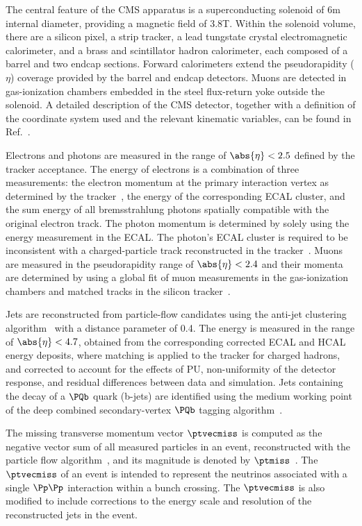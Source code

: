 The central feature of the CMS apparatus is a superconducting solenoid of 6\unit{m} internal diameter, providing a magnetic field of 3.8\unit{T}. Within the solenoid volume, there are a silicon pixel, a strip tracker, a lead tungstate crystal electromagnetic calorimeter, and a brass and scintillator hadron calorimeter, each composed of a barrel and two endcap sections. Forward calorimeters extend the pseudorapidity ($\eta$) coverage provided by the barrel and endcap detectors. Muons are detected in gas-ionization chambers embedded in the steel flux-return yoke outside the solenoid. A detailed description of the CMS detector, together with a definition of the coordinate system used and the relevant kinematic variables, can be found in Ref.~\cite{Chatrchyan:2008zzk}.

Electrons and photons are measured in the range of $\abs{\eta} < 2.5$ defined by the tracker acceptance. The energy of electrons is a combination of three measurements: the electron momentum at the primary interaction vertex as determined by the tracker~\cite{pvdefinition}, the energy of the corresponding ECAL cluster, and the sum energy of all bremsstrahlung photons spatially compatible with the original electron track. The photon momentum is determined by solely using the energy measurement in the ECAL. The photon's ECAL cluster is required to be inconsistent with a charged-particle track reconstructed in the tracker~\cite{cmscollaboration2020electron}. Muons are measured in the pseudorapidity range of $\abs{\eta} < 2.4$ and their momenta are determined by using a global fit of muon measurements in the gas-ionization chambers and matched tracks in the silicon tracker~\cite{Sirunyan:2018}.


Jets are reconstructed from particle-flow candidates using the anti-\kt jet clustering algorithm~\cite{antikt} with a distance parameter of 0.4. The energy is measured in the range of $\abs{\eta}<4.7$, obtained from the corresponding corrected ECAL and HCAL energy deposits, where matching is applied to the tracker for charged hadrons, and corrected to account for the effects of PU, non-uniformity of the detector response, and residual differences between data and simulation. Jets containing the decay of a $\PQb$ quark (b-jets) are identified using the medium working point of the deep combined secondary-vertex $\PQb$ tagging algorithm~\cite{CMS:2017wtu}.


The missing transverse momentum vector $\ptvecmiss$ is computed as the negative vector \pt sum of all measured particles in an event, reconstructed with the particle flow algorithm~\cite{CMS-PRF-14-001}, and its magnitude is denoted by $\ptmiss$~\cite{Sirunyan_2019}. The $\ptvecmiss$ of an event is intended to represent the neutrinos associated with a single $\Pp \Pp$ interaction within a bunch crossing. The $\ptvecmiss$ is also modified to include corrections to the energy scale and resolution of the reconstructed jets in the event.

